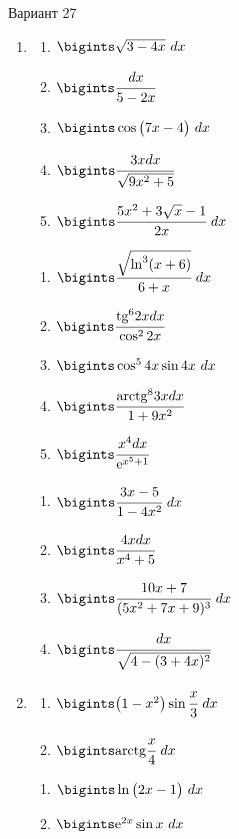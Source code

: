 \documentclass{article}
\begin{document}
\begin{multicols}{2}
	\centerline{Вариант 27}
	\begin{enumerate}[label=\Roman*.]
		\item
		\begin{multicols}{3}
			\begin{enumerate}[label=\arabic*.]
				\setlength\itemsep{1em}
				\item $\bigints\sqrt{3-4x}\ dx$
				\item $\bigints\cfrac{dx}{5-2x}$
				\item $\bigints\cos \big( 7x-4 \big)\ dx$
				\item $\bigints\cfrac{3xdx}{\sqrt{9x^2+5}}$
				\item $\bigints\cfrac{5x^2+3\sqrt{x}-1}{2x}\ dx$
			\end{enumerate}
			\vfill\null\columnbreak
			\begin{enumerate}[label=\arabic*. , start=6]
				\setlength\itemsep{1em}
				\item $\bigints\cfrac{\sqrt{\ln^3 (x+6)}}{6+x}\ dx$
				\item $\bigints\cfrac{\mbox{tg}^62xdx}{\cos^22x}$
				\item $\bigints\cos^54x\sin4x\ dx$
				\item $\bigints\cfrac{\mbox{arctg}^83xdx}{1+9x^2}$
				\item $\bigints \cfrac{x^4dx}{\mbox{e}^{x^5+1}}$
			\end{enumerate}
			\vfill\null\columnbreak
			\begin{enumerate}[label=\arabic*. , start=11]
				\setlength\itemsep{1em}
				\item $\bigints\cfrac{3x-5}{1-4x^2}\ dx$
				\item $\bigints\cfrac{4xdx}{x^4+5}$
				\item $\bigints\cfrac{10x+7}{(5x^2+7x+9)^3}\ dx$
				\item $\bigints\cfrac{dx}{\sqrt{4-(3+4x)^2}}$
			\end{enumerate}
			\vfill\null\columnbreak
		\end{multicols}
		
		\item
		\begin{multicols}{3}
			\begin{enumerate}[label=\arabic*.]
				\setlength\itemsep{1em}
				\item $\bigints\big(1-x^2\big)\sin\cfrac{x}{3}\ dx$
				\item $\bigints\mbox{arctg}\cfrac{x}{4}\ dx$
			\end{enumerate}
			\vfill\null\columnbreak
			\begin{enumerate}[label=\arabic*., start=3]
				\setlength\itemsep{1em}
				\item $\bigints\ln\big(2x-1\big)\ dx$
				\item $\bigints\mbox{e}^{2x}\sin x\ dx$
			\end{enumerate}
			\vfill\null\columnbreak
			\vfill\null\columnbreak
		\end{multicols}
		

\end{enumerate}
\end{multicols}
\end{document}
